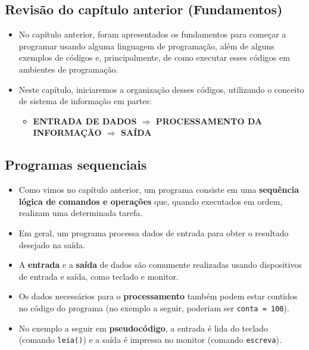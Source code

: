 \documentclass[12pt,a4paper]{article}
\providecommand{\tightlist}{%
      \setlength{\itemsep}{0pt}\setlength{\parskip}{0pt}}
\begin{document}
    \hypertarget{revisuxe3o-do-capuxedtulo-anterior-fundamentos}{%
\subsection{Revisão do capítulo anterior
(Fundamentos)}\label{revisuxe3o-do-capuxedtulo-anterior-fundamentos}}

    \begin{itemize}
\item
  No capítulo anterior, foram apresentados os fundamentos para começar a
  programar usando alguma linguagem de programação, além de alguns
  exemplos de códigos e, principalmente, de como executar esses códigos
  em ambientes de programação.
\item
  Neste capítulo, iniciaremos a organização desses códigos, utilizando o
  conceito de sistema de informação em partes:

  \begin{itemize}
  \tightlist
  \item
    \textbf{ENTRADA DE DADOS \(\Rightarrow\) PROCESSAMENTO DA INFORMAÇÃO
    \(\Rightarrow\) SAÍDA}
  \end{itemize}
\end{itemize}

    \hypertarget{programas-sequenciais}{%
\subsection{Programas sequenciais}\label{programas-sequenciais}}

    \begin{itemize}
\item
  Como vimos no capítulo anterior, um programa consiste em uma
  \textbf{sequência lógica de comandos e operações} que, quando
  executados em ordem, realizam uma determinada tarefa.
\item
  Em geral, um programa processa dados de entrada para obter o resultado
  desejado na saída.
\item
  A \textbf{entrada} e a \textbf{saída} de dados são comumente
  realizadas usando dispositivos de entrada e saída, como teclado e
  monitor.
\item
  Os dados necessários para o \textbf{processamento} também podem estar
  contidos no código do programa (no exemplo a seguir, poderiam ser
  \texttt{conta\ =\ 100}).
\item
  No exemplo a seguir em \textbf{pseudocódigo}, a entrada é lida do
  teclado (comando \texttt{leia()}) e a saída é impressa no monitor
  (comando \texttt{escreva}).
\end{itemize}
\end{document}
